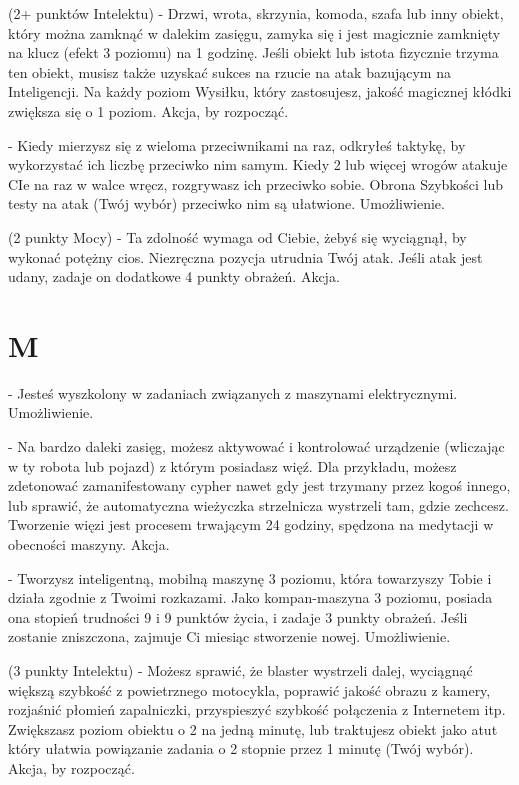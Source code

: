 { (2+ punktów Intelektu) - Drzwi, wrota, skrzynia, komoda, szafa lub inny obiekt, który można zamknąć w dalekim zasięgu, zamyka się i jest magicznie zamknięty na klucz (efekt 3 poziomu) na 1 godzinę. Jeśli obiekt lub istota fizycznie trzyma ten obiekt, musisz także uzyskać sukces na rzucie na atak bazującym na Inteligencji. Na każdy poziom Wysiłku, który zastosujesz, jakość magicznej kłódki zwiększa się o 1 poziom. Akcja, by rozpocząć. 

 - Kiedy mierzysz się z wieloma przeciwnikami na raz, odkryłeś taktykę, by wykorzystać ich liczbę przeciwko nim samym. Kiedy 2 lub więcej wrogów atakuje CIe na raz w walce wręcz, rozgrywasz ich przeciwko sobie. Obrona Szybkości lub testy na atak (Twój wybór) przeciwko nim są ułatwione. Umożliwienie.

 (2 punkty Mocy) - Ta zdolność wymaga od Ciebie, żebyś się wyciągnął, by wykonać potężny cios. Niezręczna pozycja utrudnia Twój atak. Jeśli atak jest udany, zadaje on dodatkowe 4 punkty obrażeń. Akcja.

\section{M}

 - Jesteś wyszkolony w zadaniach związanych z maszynami elektrycznymi. Umożliwienie.

 - Na bardzo daleki zasięg, możesz aktywować i kontrolować urządzenie (wliczając w ty robota lub pojazd) z którym posiadasz więź. Dla przykładu, możesz zdetonować zamanifestowany cypher nawet gdy jest trzymany przez kogoś innego, lub sprawić, że automatyczna wieżyczka strzelnicza wystrzeli tam, gdzie zechcesz. Tworzenie więzi jest procesem trwającym 24 godziny, spędzona na medytacji w obecności maszyny. Akcja.

 - Tworzysz inteligentną, mobilną maszynę 3 poziomu, która towarzyszy Tobie i działa zgodnie z Twoimi rozkazami. Jako kompan-maszyna 3 poziomu, posiada ona stopień trudności 9 i 9 punktów życia, i zadaje 3 punkty obrażeń. Jeśli zostanie zniszczona, zajmuje Ci miesiąc stworzenie nowej. Umożliwienie.

 (3 punkty Intelektu) - Możesz sprawić, że blaster wystrzeli dalej, wyciągnąć większą szybkość z powietrznego motocykla, poprawić jakość obrazu z kamery, rozjaśnić płomień zapalniczki, przyspieszyć szybkość połączenia z Internetem itp. Zwiększasz poziom obiektu o 2 na jedną minutę, lub traktujesz obiekt jako atut który ułatwia powiązanie zadania o 2 stopnie przez 1 minutę (Twój wybór). Akcja, by rozpocząć. 

}
